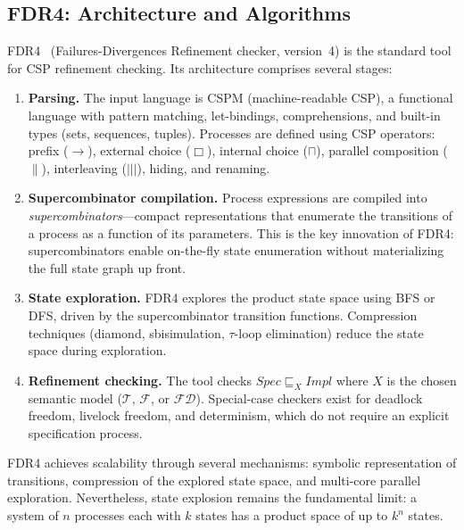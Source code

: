 \documentclass[11pt]{article}
\begin{document}
\subsection{FDR4: Architecture and Algorithms}

FDR4~\cite{fdr4} (Failures-Divergences Refinement checker, version~4)
is the standard tool for CSP refinement checking.  Its architecture
comprises several stages:

\begin{enumerate}
\item \textbf{Parsing.}  The input language is CSPM (machine-readable
  CSP), a functional language with pattern matching, let-bindings,
  comprehensions, and built-in types (sets, sequences, tuples).
  Processes are defined using CSP operators: prefix ($\to$),
  external choice ($\Box$), internal choice ($\sqcap$), parallel
  composition ($\|$), interleaving ($|||$), hiding, and renaming.

\item \textbf{Supercombinator compilation.}  Process expressions are
  compiled into \emph{supercombinators}---compact representations that
  enumerate the transitions of a process as a function of its
  parameters.  This is the key innovation of FDR4: supercombinators
  enable on-the-fly state enumeration without materializing the full
  state graph up front.

\item \textbf{State exploration.}  FDR4 explores the product state
  space using BFS or DFS, driven by the supercombinator transition
  functions.  Compression techniques (diamond, sbisimulation,
  $\tau$-loop elimination) reduce the state space during exploration.

\item \textbf{Refinement checking.}  The tool checks
  $\mathit{Spec} \sqsubseteq_X \mathit{Impl}$ where $X$ is the
  chosen semantic model ($\mathcal{T}$, $\mathcal{F}$, or
  $\mathcal{FD}$).  Special-case checkers exist for deadlock freedom,
  livelock freedom, and determinism, which do not require an explicit
  specification process.
\end{enumerate}

FDR4 achieves scalability through several mechanisms: symbolic
representation of transitions, compression of the explored state
space, and multi-core parallel exploration.  Nevertheless, state
explosion remains the fundamental limit: a system of $n$ processes
each with $k$ states has a product space of up to $k^n$ states.
\end{document}
